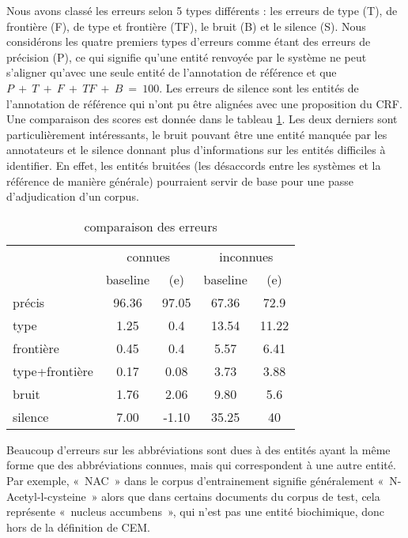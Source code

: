 \documentclass[PhD-Yoann-Dupont.tex]{subfiles}
\begin{document}
Nous avons classé les erreurs selon 5 types différents : les erreurs de type (T), de frontière (F), de type et frontière (TF), le bruit (B) et le silence (S). Nous considérons les quatre premiers types d'erreurs comme étant des erreurs de précision (P), ce qui signifie qu'une entité renvoyée par le système ne peut s'aligner qu'avec une seule entité de l'annotation de référence et que $P\ +\ T\ +\ F\ +\ TF\ +\ B\ =\ 100$. Les erreurs de silence sont les entités de l'annotation de référence qui n'ont pu être alignées avec une proposition du CRF. Une comparaison des scores est donnée dans le tableau \ref{tab:error-comparison}. Les deux derniers sont particulièrement intéressants, le bruit pouvant être une entité manquée par les annotateurs et le silence donnant plus d'informations sur les entités difficiles à identifier. En effet, les entités bruitées (les désaccords entre les systèmes et la référence de manière générale) pourraient servir de base pour une passe d'adjudication d'un corpus.

\begin{table}[ht!]
\centering
\begin{tabular}{|l|cc|cc|}
\cline{2-5}
\multicolumn{1}{l|}{} & \multicolumn{2}{|c|}{connues} & \multicolumn{2}{|c|}{inconnues}    \\
\multicolumn{1}{l|}{} & baseline & (e)                & baseline  & (e)   \\
\hline
précis                & 96.36    & 97.05              & 67.36    & 72.9 \\
\hline
type                  &  1.25    & 0.4                & 13.54    & 11.22 \\
frontière             &  0.45    & 0.4                & 5.57     & 6.41 \\
type+frontière        &  0.17    & 0.08               & 3.73     & 3.88 \\
bruit                 &  1.76    & 2.06               & 9.80     & 5.6 \\
\hline
silence               &  7.00    & -1.10              & 35.25    & 40 \\
\hline
\end{tabular}
\caption{comparaison des erreurs}
\label{tab:error-comparison}
\end{table}

Beaucoup d'erreurs sur les abbréviations sont dues à des entités ayant la même forme que des abbréviations connues, mais qui correspondent à une autre entité. Par exemple, «\ NAC\ » dans le corpus d'entrainement signifie généralement «\ N-Acetyl-l-cysteine\ » alors que dans certains documents du corpus de test, cela représente «\ nucleus accumbens\ », qui n'est pas une entité biochimique, donc hors de la définition de CEM.
\end{document}
